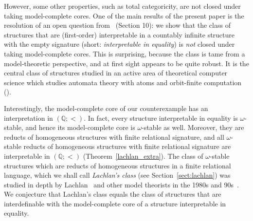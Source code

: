 \documentclass{amsart}
\theoremstyle{definition}
\theoremstyle{remark}
\numberwithin{equation}{section}
\begin{document}




However, some other properties, such as total categoricity, are not closed under taking model-complete cores. 
One of the main results of the present paper is the resolution of an open question from~\cite{bodirsky2021permutation} (Section 10): 
we show that the class of structures that are (first-order) interpretable in
a countably infinite structure with the empty signature (short: \emph{interpretable {in} equality}) is \emph{not} closed under taking model-complete cores. This is surprising, because the class is tame from a model-theoretic perspective, and at first sight appears to be quite robust. 
It is the central class of structures studied in an active area of theoretical computer science which studies automata theory with atoms and orbit-finite computation (\cite{DBLP:conf/lics/BojanczykKLT13,KlinLOT14-short,DBLP:journals/corr/BojanczykKL14,BojanczykTorunczyk18,OrbitFinDim,Orbit-finite-LP}). 


Interestingly, the model-complete core of our counterexample has an interpretation in $({\mathbb Q};<)$.
In fact, every structure interpretable {in} equality is $\omega$-stable, 
and hence its model-complete core is $\omega$-stable as well. 
Moreover, they are reducts of homogeneous structures with finite relational signature, and all $\omega$-stable reducts of homogeneous structures with finite relational signature are interpretable {in} $({\mathbb Q};<)$ (Theorem~\ref{lachlan_extra}). The class of $\omega$-stable structures which are reducts of homogeneous structures in a finite relational language, which we shall call \emph{Lachlan's class} ({see Section~\ref{sect:lachlan}}) was studied in depth by  Lachlan~\cite{LachlanSurvey, LachlanIndiscernible, CherlinLachlan} and other model theorists in the 1980s and 90s~\cite{HrushovskiTotallyCategorical, macpherson1991interpreting}. We conjecture that Lachlan's class equals the class of structures that are interdefinable with the model-complete core of a structure interpretable in equality.
\end{document}
